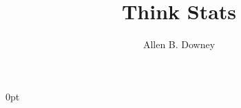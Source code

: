 \documentclass[12pt]{book}
\title{Think Stats}
\author{Allen B. Downey}
\newif\ifplastex
\begin{document}
\frontmatter

\newcommand{\Erdos}{Erd\H{o}s}
\newcommand{\nhat}{\hat{N}}
\newcommand{\eps}{\varepsilon}
\newcommand{\slope}{\beta}
\newcommand{\inter}{\alpha}
\newcommand{\xbar}{\bar{x}}
\newcommand{\ybar}{\bar{y}}
\newcommand{\PMF}{\mathrm{PMF}}
\newcommand{\PDF}{\mathrm{PDF}}
\newcommand{\CDF}{\mathrm{CDF}}
\newcommand{\ICDF}{\mathrm{ICDF}}
\newcommand{\Prob}{\mathrm{P}}
\newcommand{\Corr}{\mathrm{Corr}}
\newcommand{\normal}{\mathcal{N}}
\newcommand{\given}{|}
\newcommand{\goodchi}{\protect\raisebox{2pt}{$\chi$}}

\ifplastex
    \usepackage{localdef}
    \maketitle

\newcount\anchorcnt
\newcommand*{\Anchor}[1]{%
  \@bsphack%
    \Hy@GlobalStepCount\anchorcnt%
    \edef\@currentHref{anchor.\the\anchorcnt}%
    \Hy@raisedlink{\hyper@anchorstart{\@currentHref}\hyper@anchorend}%
    \M@gettitle{}\label{#1}%
    \@esphack%
}


\else


  {\topsep}%
  {\topsep}%
  {}%
  {0pt}%
  {\bfseries}%
  {}%
  { }%
  {}%

\theoremstyle{exercise}
\newtheorem{exercise}{Exercise}[chapter]




\end{document}
